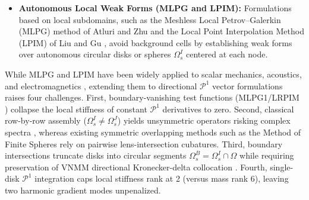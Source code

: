 \documentclass[VANCOUVER]{USG}
\begin{document}
\begin{itemize}
    \item \textbf{Autonomous Local Weak Forms (MLPG and LPIM):} Formulations based on local subdomains, such as the Meshless Local Petrov--Galerkin (MLPG) method of Atluri and Zhu \cite{atluri1998new, atluri2002meshless} and the Local Point Interpolation Method (LPIM) of Liu and Gu \cite{liu2001local, liu2005introduction}, avoid background cells by establishing weak forms over autonomous circular disks or spheres $\Omega_s^I$ centered at each node.
\end{itemize}

While MLPG and LPIM have been widely applied to scalar mechanics, acoustics, and electromagnetics \cite{sladek2001local, atluri2002meshless, liu2001local, nicomedes2012meshless}, extending them to directional $\mathcal{P}^1$ vector formulations raises four challenges. First, boundary-vanishing test functions (MLPG1/LRPIM \cite{atluri1998new, atluri2002meshless, liu2005introduction}) collapse the local stiffness of constant $\mathcal{P}^1$ derivatives to zero. Second, classical row-by-row assembly ($\Omega_s^I \ne \Omega_s^J$) \cite{atluri2002meshless, liu2001local, nicomedes2012meshless} yields unsymmetric operators risking complex spectra \cite{saad2011numerical, boffi2013mixed}, whereas existing symmetric overlapping methods such as the Method of Finite Spheres \cite{de2000method, nicomedes2017meshfree, nicomedes2021acoustic} rely on pairwise lens-intersection cubatures. Third, boundary intersections truncate disks into circular segments $\Omega_s^B = \Omega_s^I \cap \Omega$ while requiring preservation of VNMM directional Kronecker-delta collocation \cite{ortiz2021nodal, goncalves2023vector, stable_vnmm2d_2026}. Fourth, single-disk $\mathcal{P}^1$ integration caps local stiffness rank at 2 (versus mass rank 6), leaving two harmonic gradient modes unpenalized.
\end{document}
